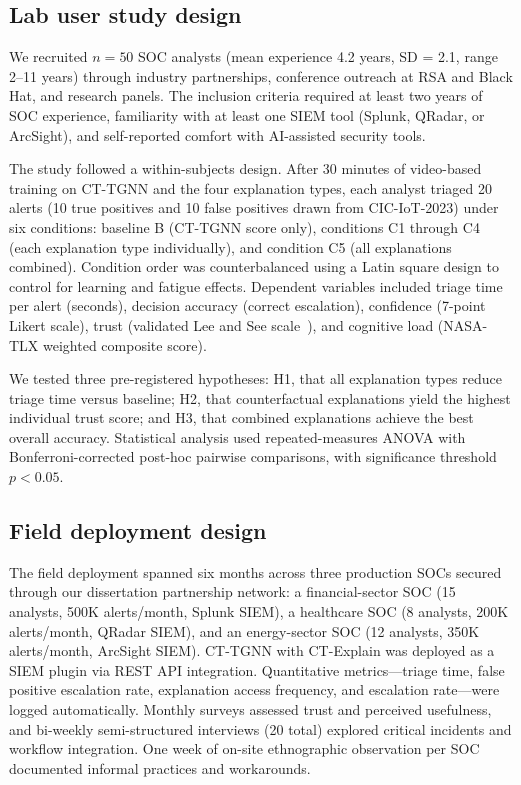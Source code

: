 \documentclass[preprint,review,12pt]{elsarticle}
\begin{document}
\subsection{Lab user study design}

We recruited $n = 50$ SOC analysts (mean experience 4.2 years, SD = 2.1, range 2--11 years) through industry partnerships, conference outreach at RSA and Black Hat, and research panels. The inclusion criteria required at least two years of SOC experience, familiarity with at least one SIEM tool (Splunk, QRadar, or ArcSight), and self-reported comfort with AI-assisted security tools.

The study followed a within-subjects design. After 30 minutes of video-based training on CT-TGNN and the four explanation types, each analyst triaged 20 alerts (10 true positives and 10 false positives drawn from CIC-IoT-2023) under six conditions: baseline B (CT-TGNN score only), conditions C1 through C4 (each explanation type individually), and condition C5 (all explanations combined). Condition order was counterbalanced using a Latin square design to control for learning and fatigue effects. Dependent variables included triage time per alert (seconds), decision accuracy (correct escalation), confidence (7-point Likert scale), trust (validated Lee and See scale~\cite{lee_see_2004}), and cognitive load (NASA-TLX weighted composite score).

We tested three pre-registered hypotheses: H1, that all explanation types reduce triage time versus baseline; H2, that counterfactual explanations yield the highest individual trust score; and H3, that combined explanations achieve the best overall accuracy. Statistical analysis used repeated-measures ANOVA with Bonferroni-corrected post-hoc pairwise comparisons, with significance threshold $p < 0.05$.

\subsection{Field deployment design}

The field deployment spanned six months across three production SOCs secured through our dissertation partnership network: a financial-sector SOC (15 analysts, 500K alerts/month, Splunk SIEM), a healthcare SOC (8 analysts, 200K alerts/month, QRadar SIEM), and an energy-sector SOC (12 analysts, 350K alerts/month, ArcSight SIEM). CT-TGNN with CT-Explain was deployed as a SIEM plugin via REST API integration. Quantitative metrics---triage time, false positive escalation rate, explanation access frequency, and escalation rate---were logged automatically. Monthly surveys assessed trust and perceived usefulness, and bi-weekly semi-structured interviews (20 total) explored critical incidents and workflow integration. One week of on-site ethnographic observation per SOC documented informal practices and workarounds.
\end{document}
